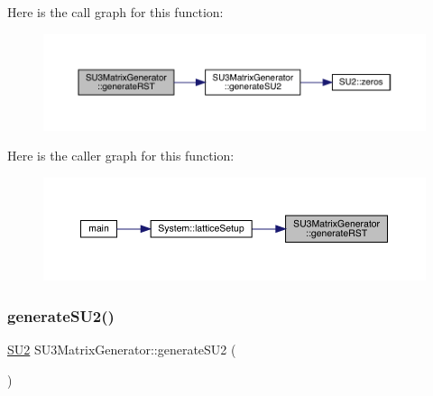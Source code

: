 Here is the call graph for this function\+:\nopagebreak
\begin{figure}[H]
\begin{center}
\leavevmode
\includegraphics[width=350pt]{class_s_u3_matrix_generator_a478a6d34a643f4ee30bc333ca1023b00_cgraph}
\end{center}
\end{figure}
Here is the caller graph for this function\+:\nopagebreak
\begin{figure}[H]
\begin{center}
\leavevmode
\includegraphics[width=350pt]{class_s_u3_matrix_generator_a478a6d34a643f4ee30bc333ca1023b00_icgraph}
\end{center}
\end{figure}
\mbox{\label{class_s_u3_matrix_generator_aa4e04caff654a1df7c43280b85f359bc}} 
\subsubsection{\texorpdfstring{generateSU2()}{generateSU2()}}
{\footnotesize\ttfamily \mbox{\hyperlink{class_s_u2}{S\+U2}} S\+U3\+Matrix\+Generator\+::generate\+S\+U2 (\begin{DoxyParamCaption}{ }\end{DoxyParamCaption})\hspace{0.3cm}{\ttfamily [inline]}}

